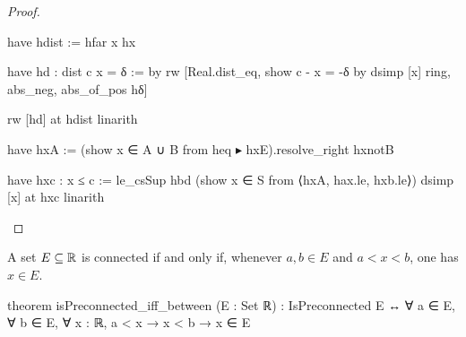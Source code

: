 \begin{proof}
\begin{lean}
      have hdist := hfar x hx

      have hd : dist c x = δ := by
        rw [Real.dist_eq, show c - x = -δ by
          dsimp [x]
          ring, abs_neg, abs_of_pos hδ]

      rw [hd] at hdist
      linarith

    have hxA := (show x ∈ A ∪ B from heq ▸ hxE).resolve_right hxnotB

    have hxc : x ≤ c := le_csSup hbd (show x ∈ S from ⟨hxA, hax.le, hxb.le⟩)
    dsimp [x] at hxc
    linarith
  \end{lean}

\end{proof}

\begin{theorem}
  \label{an1:thm:connected-sets-in-R}
  A set $E\subseteq\mathbb{R}$ is connected if and only if, whenever $a,b\in E$ and $a<x<b$, one has $x\in
    E$.

  \begin{lean}
    theorem isPreconnected_iff_between (E : Set ℝ) :
        IsPreconnected E ↔ ∀ a ∈ E, ∀ b ∈ E, ∀ x : ℝ, a < x → x < b → x ∈ E
  \end{lean}
\end{theorem}

